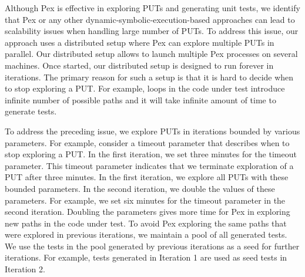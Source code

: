 Although Pex is effective in exploring PUTs and generating unit tests,
we identify that Pex or any other dynamic-symbolic-execution-based approaches
can lead to scalability issues when handling large number 
of PUTs. To address this issue, our approach uses a distributed 
setup where Pex can explore multiple PUTs in parallel. Our distributed
setup allows to launch multiple Pex processes on several machines.
Once started, our distributed setup is designed to run forever in iterations. 
The primary reason for such a setup is that it is hard to 
decide when to stop exploring a PUT. For example, loops in the
code under test introduce infinite number of possible paths and 
it will take infinite amount of time to generate tests.

To address the preceding issue, we explore PUTs in iterations bounded by
various parameters. For example, consider a timeout parameter that describes
when to stop exploring a PUT. In the first iteration, we set three minutes
for the timeout parameter. This timeout parameter indicates that we terminate
exploration of a PUT after three minutes. In the first iteration, we explore all PUTs with
these bounded parameters. In the second iteration, we double the values
of these parameters. For example, we set six minutes for the timeout parameter
in the second iteration. Doubling the parameters gives more time for
Pex in exploring new paths in the code under test. 
To avoid Pex exploring the same paths that were explored in previous iterations, we 
maintain a pool of all generated tests. We use the tests in the pool generated
by previous iterations as a seed for further iterations.
For example, tests generated in Iteration 1 are used as seed tests in Iteration 2. 
